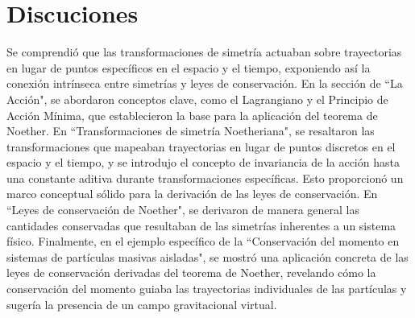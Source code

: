 \documentclass[a4paper,11pt]{article}
\begin{document}
\section{Discuciones}
Se comprendió que las transformaciones de simetría actuaban sobre trayectorias en lugar de puntos específicos en el espacio y el tiempo, exponiendo así la conexión intrínseca entre simetrías y leyes de conservación. En la sección de ``La Acción", se abordaron conceptos clave, como el Lagrangiano y el Principio de Acción Mínima, que establecieron la base para la aplicación del teorema de Noether. En ``Transformaciones de simetría Noetheriana", se resaltaron las transformaciones que mapeaban trayectorias en lugar de puntos discretos en el espacio y el tiempo, y se introdujo el concepto de invariancia de la acción hasta una constante aditiva durante transformaciones específicas. Esto proporcionó un marco conceptual sólido para la derivación de las leyes de conservación. En ``Leyes de conservación de Noether", se derivaron de manera general las cantidades conservadas que resultaban de las simetrías inherentes a un sistema físico. Finalmente, en el ejemplo específico de la ``Conservación del momento en sistemas de partículas masivas aisladas", se mostró una aplicación concreta de las leyes de conservación derivadas del teorema de Noether, revelando cómo la conservación del momento guiaba las trayectorias individuales de las partículas y sugería la presencia de un campo gravitacional virtual.



































\end{document}
